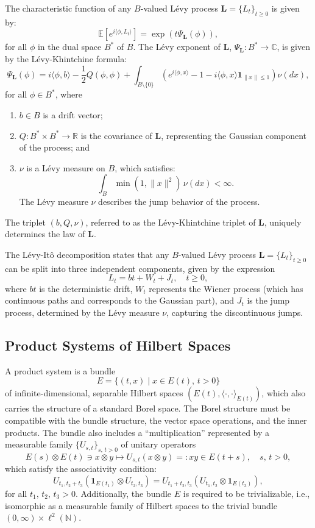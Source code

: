 \documentclass[11pt]{amsart}
\theoremstyle{definition}
\theoremstyle{remark}
\numberwithin{equation}{section}
\begin{document}
The characteristic function of any \(B\)-valued L\'evy process \(\bm{L} = \{L_t\}_{t \geq 0}\) is given by:
\[
\mathbb{E}\left[e^{i\langle \phi, L_t \rangle}\right] = \exp(t \Psi_{\bm{L}}(\phi)),
\]
for all \(\phi\) in the dual space \(B^*\) of \(B\). The L\'evy exponent of \(\bm{L}\), \(\Psi_{\bm{L}}: B^* \to \mathbb{C}\), is given by the L\'evy-Khintchine formula:
\[
\Psi_{\bm{L}}(\phi) = i \langle \phi, b \rangle - \frac{1}{2} Q(\phi, \phi) + \int_{B \setminus \{0\}} \left(e^{i \langle \phi, x \rangle} - 1 - i \langle \phi, x \rangle \mathbf{1}_{\|x\| \leq 1}\right) \nu(dx),
\]
for all \(\phi \in B^*\), where 
\begin{enumerate}
    \item[(i)] \(b \in B\) is a drift vector;
    \item[(ii)] \(Q: B^* \times B^* \to \mathbb{R}\) is the covariance of \(\bm{L}\), representing the Gaussian component of the process; and
    \item[(iii)] \(\nu\) is a L\'evy measure on \(B\), which satisfies:
    \[
    \int_{B} \min(1, \|x\|^2) \, \nu(dx) < \infty.
    \]
    The L\'evy measure \(\nu\) describes the jump behavior of the process.
\end{enumerate}
The triplet \((b, Q, \nu)\), referred to as the L\'evy-Khintchine triplet of \(\bm{L}\), uniquely determines the law of \(\bm{L}\).

The L\'evy-It\^o decomposition states that any \(B\)-valued L\'evy process \(\bm{L} = \{L_t\}_{t \geq 0}\) can be split into three independent components, given by the expression
\[
L_t = bt + W_t + J_t, \quad t \geq 0,
\]
where \(bt\) is the deterministic drift, \(W_t\) represents the Wiener process (which has continuous paths and corresponds to the Gaussian part), and \(J_t\) is the jump process, determined by the L\'evy measure \(\nu\), capturing the discontinuous jumps.


\subsection{Product Systems of Hilbert Spaces}

A product system is a bundle 
\[
E = \{(t, x) \mid x \in E(t),\, t > 0\}
\]
of infinite-dimensional, separable Hilbert spaces \((E(t), \langle \cdot, \cdot \rangle_{E(t)})\), which also carries the structure of a standard Borel space. The Borel structure must be compatible with the bundle structure, the vector space operations, and the inner products. The bundle also includes a ``multiplication'' represented by a measurable family \(\{U_{s, t}\}_{s,\,t > 0}\) of unitary operators
\[
E(s) \otimes E(t) \ni x \otimes y \longmapsto U_{s,t}(x \otimes y) =: xy \in E(t+s), \quad s,\, t > 0,
\]
which satisfy the associativity condition:
\begin{equation}\label{intro2}
U_{t_1, t_2+t_3}(\mathbf{1}_{E(t_1)} \otimes U_{t_2,t_3}) = U_{t_1+t_2,t_3}(U_{t_1, t_2} \otimes \mathbf{1}_{E(t_3)}),
\end{equation}
for all \(t_1,\, t_2,\, t_3 > 0\). Additionally, the bundle \(E\) is required to be trivializable, i.e., isomorphic as a measurable family of Hilbert spaces to the trivial bundle \((0, \infty) \times \ell^2(\mathbb{N})\).
\end{document}
